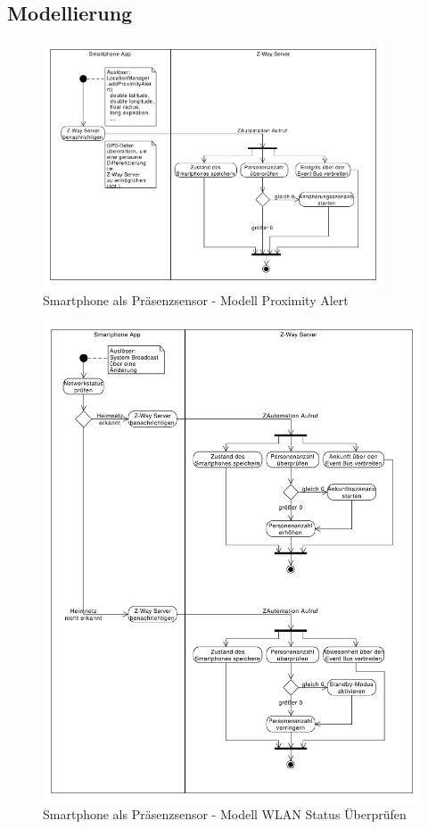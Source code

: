\subsection{Modellierung}
\begin{figure}[h!]
	\centering
	\includegraphics[width=0.9\textwidth]{img/Szenarien/SmartphoneProximity.pdf}
	\caption{Smartphone als Präsenzsensor - Modell Proximity Alert}
	\label{fig:szenarienSmartphoneProximity}
\end{figure}

\begin{figure}[h!]
	\centering
	\includegraphics[width=1.0\textwidth]{img/Szenarien/SmartphoneWlan.pdf}
	\caption{Smartphone als Präsenzsensor - Modell WLAN Status Überprüfen}
	\label{fig:szenarienSmartphoneWlan}
\end{figure}

